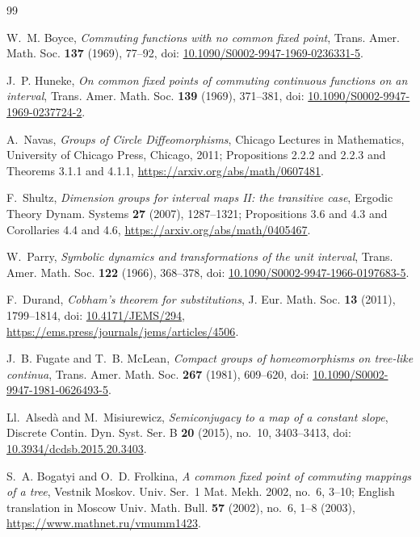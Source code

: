\documentclass[11pt]{article}
\theoremstyle{definition}
\theoremstyle{remark}
\begin{document}
\begin{thebibliography}{99}

W.~M. Boyce,
\emph{Commuting functions with no common fixed point},
Trans. Amer. Math. Soc. \textbf{137} (1969), 77--92,
doi: \href{https://doi.org/10.1090/S0002-9947-1969-0236331-5}
{10.1090/S0002-9947-1969-0236331-5}.

J.~P. Huneke,
\emph{On common fixed points of commuting continuous functions on an
interval},
Trans. Amer. Math. Soc. \textbf{139} (1969), 371--381,
doi: \href{https://doi.org/10.1090/S0002-9947-1969-0237724-2}
{10.1090/S0002-9947-1969-0237724-2}.

A.~Navas,
\emph{Groups of Circle Diffeomorphisms},
Chicago Lectures in Mathematics,
University of Chicago Press, Chicago, 2011;
Propositions 2.2.2 and 2.2.3 and Theorems 3.1.1 and 4.1.1,
\url{https://arxiv.org/abs/math/0607481}.

F.~Shultz,
\emph{Dimension groups for interval maps II: the transitive case},
Ergodic Theory Dynam. Systems \textbf{27} (2007), 1287--1321;
Propositions 3.6 and 4.3 and Corollaries 4.4 and 4.6,
\url{https://arxiv.org/abs/math/0405467}.

W.~Parry,
\emph{Symbolic dynamics and transformations of the unit interval},
Trans. Amer. Math. Soc. \textbf{122} (1966), 368--378,
doi: \href{https://doi.org/10.1090/S0002-9947-1966-0197683-5}
{10.1090/S0002-9947-1966-0197683-5}.

F.~Durand,
\emph{Cobham's theorem for substitutions},
J. Eur. Math. Soc. \textbf{13} (2011), 1799--1814,
doi: \href{https://doi.org/10.4171/JEMS/294}{10.4171/JEMS/294},
\url{https://ems.press/journals/jems/articles/4506}.

J.~B. Fugate and T.~B. McLean,
\emph{Compact groups of homeomorphisms on tree-like continua},
Trans. Amer. Math. Soc. \textbf{267} (1981), 609--620,
doi: \href{https://doi.org/10.1090/S0002-9947-1981-0626493-5}
{10.1090/S0002-9947-1981-0626493-5}.

Ll.~Alsed\`a and M.~Misiurewicz,
\emph{Semiconjugacy to a map of a constant slope},
Discrete Contin. Dyn. Syst. Ser. B \textbf{20} (2015), no.~10,
3403--3413,
doi: \href{https://doi.org/10.3934/dcdsb.2015.20.3403}
{10.3934/dcdsb.2015.20.3403}.

S.~A. Bogatyi and O.~D. Frolkina,
\emph{A common fixed point of commuting mappings of a tree},
Vestnik Moskov. Univ. Ser.~1 Mat. Mekh. 2002, no.~6, 3--10;
English translation in Moscow Univ. Math. Bull. \textbf{57} (2002),
no.~6, 1--8 (2003),
\url{https://www.mathnet.ru/vmumm1423}.

\end{thebibliography}
\end{document}
